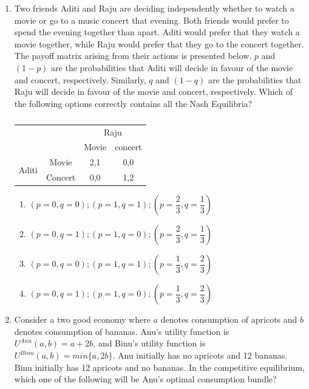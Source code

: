 \documentclass{article}
\begin{document}
\begin{enumerate}[leftmargin=*, start=45, label=Q.\arabic*.]

    \item Two friends Aditi and Raju are deciding independently whether to watch a movie or go to a music concert that evening. Both friends would prefer to spend the evening together than apart. Aditi would prefer that they watch a movie together, while Raju would prefer that they go to the concert together. The payoff matrix arising from their actions is presented below. $p$ and $(1-p)$ are the probabilities that Aditi will decide in favour of the movie and concert, respectively. Similarly, $q$ and $(1-q)$ are the probabilities that Raju will decide in favour of the movie and concert, respectively. Which of the following options correctly contains all the Nash Equilibria? \\
    \begin{table}[h]
        \centering    
    \begin{tabular}{|c|c|c|c|}
    \hline
     \multicolumn{2}{|c|}{} & \multicolumn{2}{c|}{Raju} \\ \cline{3-4}
     \multicolumn{2}{|c|}{} & Movie & concert \\ \hline
     \multirow{2}{*}{Aditi} & Movie & 2,1 & 0,0 \\ \cline{2-4}
     & Concert & 0,0 & 1,2 \\ \hline    
    \end{tabular}
    \caption{}

    \end{table}

    \begin{multicols}{2}
    \begin{enumerate}
        \item $(p = 0,q = 0); (p=1,q=1); (p=\dfrac{2}{3},q=\dfrac{1}{3})$
        \item $(p=0,q=1);(p=1,q=0);(p=\dfrac{2}{3},q=\dfrac{1}{3})$
        \item $(p = 0,q = 0); (p=1,q=1); (p=\dfrac{1}{3},q=\dfrac{2}{3})$
        \item $(p=0,q=1);(p=1,q=0);(p=\dfrac{1}{3},q=\dfrac{2}{3})$
     \end{enumerate}
     \end{multicols}

    \item Consider a two good economy where $a$ denotes consumption of apricots and $b$ denotes consumption of bananas. Anu’s utility function is $U^{Anu}(a,b)=a+2b$, and Binu’s utility function is $U^{Binu}(a,b)=min\{a,2b\}$. Anu initially has no apricots and 12 bananas. Binu initially has 12 apricots and no bananas. In the competitive equilibrium, which one of the following will be Anu’s optimal consumption bundle?


\end{enumerate}
\end{document}
